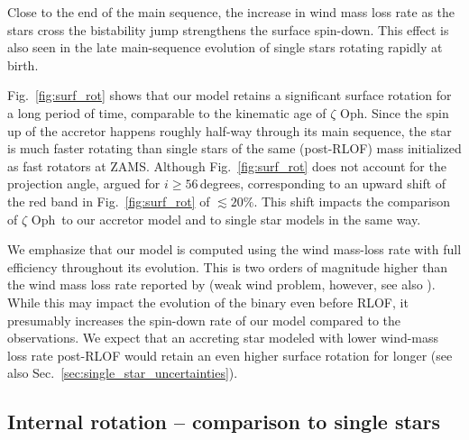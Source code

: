 \documentclass[twocolumn,twocolappendix,trackchanges]{aastex63}
\DeclareRobustCommand{\Figref}[1]{Fig.~\ref{#1}}
\DeclareRobustCommand{\Secref}[1]{Sec.~\ref{#1}}
\newcommand{\zoph}{$\zeta$ Oph}
\begin{document}
Close to the end of the main sequence, the increase in wind mass loss
rate as the stars cross the bistability jump \citep[due to iron recombination
at $T_\mathrm{eff}\simeq25\,000\,\mathrm{K}$, e.g.,][]{vink:00}
strengthens the surface spin-down. This effect is also seen in the
late main-sequence evolution of single stars rotating rapidly at
birth.

\Figref{fig:surf_rot} shows that our model retains a significant
surface rotation for a long period of time, comparable to the
kinematic age of \zoph. Since the spin up of the accretor happens
roughly half-way through its main sequence, the star is much faster
rotating than single stars of the same (post-RLOF) mass initialized as
fast rotators at ZAMS. Although \Figref{fig:surf_rot} does not account
for the projection angle, \cite{zehe:18} argued for
$i\geq56$\,degrees, corresponding to an upward shift of the red band
in \Figref{fig:surf_rot} of $\lesssim 20\%$. This shift impacts the
comparison of \zoph\ to our accretor model and to single star models
in the same way.

We emphasize that our model is computed using the \cite{vink:00,
  vink:01} wind mass-loss rate with full efficiency throughout its
evolution. This is two orders of magnitude higher than the wind mass
loss rate reported by \cite{marcolino:09} (weak wind problem,
however, see also \citealt{lucy:12, lagae:21}). While this may impact
the evolution of the binary even before RLOF, it presumably increases the
spin-down rate of our model compared to the observations. We expect
that an accreting star modeled with lower wind-mass loss rate
post-RLOF would retain an even higher surface rotation for longer (see
also \Secref{sec:single_star_uncertainties}).

\subsection{Internal rotation -- comparison to  single stars}
\label{sec:rot_comparison_single}
\end{document}
